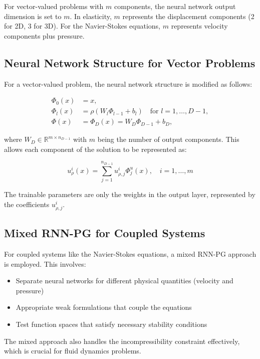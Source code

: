 \documentclass[11pt,a4paper]{article}
\begin{document}
For vector-valued problems with $m$ components, the neural network output dimension is set to $m$. In elasticity, $m$ represents the displacement components (2 for 2D, 3 for 3D). For the Navier-Stokes equations, $m$ represents velocity components plus pressure.

\subsection{Neural Network Structure for Vector Problems}

For a vector-valued problem, the neural network structure is modified as follows:

\begin{align}
\Phi_0(x) &= x, \\
\Phi_l(x) &= \rho(W_l\Phi_{l-1} + b_l) \quad \text{for } l = 1, \ldots, D-1, \\
\Phi(x) &= \Phi_D(x) = W_D\Phi_{D-1} + b_D,
\end{align}

where $W_D \in \mathbb{R}^{m \times n_{D-1}}$ with $m$ being the number of output components. This allows each component of the solution to be represented as:

\begin{equation}
u_\rho^i(x) = \sum_{j=1}^{n_{D-1}} u_{\rho,j}^i \Phi_j^u(x), \quad i = 1, \ldots, m
\end{equation}

The trainable parameters are only the weights in the output layer, represented by the coefficients $u_{\rho,j}^i$.

\subsection{Mixed RNN-PG for Coupled Systems}

For coupled systems like the Navier-Stokes equations, a mixed RNN-PG approach is employed. This involves:

\begin{itemize}
    \item Separate neural networks for different physical quantities (velocity and pressure)
    \item Appropriate weak formulations that couple the equations
    \item Test function spaces that satisfy necessary stability conditions
\end{itemize}

The mixed approach also handles the incompressibility constraint effectively, which is crucial for fluid dynamics problems.
\end{document}
